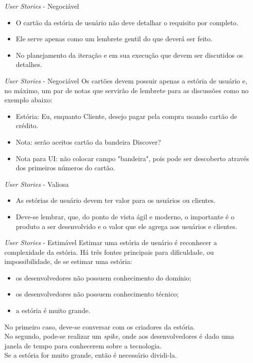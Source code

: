 \documentclass[11pt]{beamer}
\begin{document}
   \begin{frame}{\textit{User Stories} - Negociável}
      \begin{itemize}
         \item O cartão da estória de usuário não deve detalhar o requisito por completo.
         \item Ele serve apenas como um lembrete gentil do que deverá ser feito.
         \item No planejamento da iteração e em sua execução que devem ser discutidos os detalhes.
      \end{itemize}
   \end{frame}

   \begin{frame}{\textit{User Stories} - Negociável}
      Os cartões devem possuir apenas a estória de usuário e, no máximo, um par de notas que servirão de lembrete para as discussões como no exemplo abaixo:
      \begin{itemize}
         \item Estória: Eu, enquanto Cliente, desejo pagar pela compra usando cartão de crédito.
         \item Nota: serão aceitos cartão da bandeira Discover?
         \item Nota para UI: não colocar campo "bandeira", pois pode ser descoberto através dos primeiros números do cartão.
      \end{itemize}
   \end{frame}

   \begin{frame}{\textit{User Stories} - Valiosa}
      \begin{itemize}
         \item As estórias de usuário devem ter valor para os usuários ou clientes.
         \item Deve-se lembrar, que, do ponto de vista ágil e moderno, o importante é o produto a ser desenvolvido e o valor que ele agrega aos usuários e clientes.
      \end{itemize}
   \end{frame}

   \begin{frame}{\textit{User Stories} - Estimável}
      Estimar uma estória de usuário é reconhecer a complexidade da estória. Há três fontes principais para dificuldade, ou impossibilidade, de se estimar uma estória:
      \begin{itemize}
         \item os desenvolvedores não possuem conhecimento do domínio;
         \item os desenvolvedores não possuem conhecimento técnico;
         \item a estória é muito grande.
      \end{itemize}
      No primeiro caso, deve-se conversar com os criadores da estória.\\ 
      No segundo, pode-se realizar um \textit{spike}, onde aos desenvolvedores é dado uma janela de tempo para conhecerem sobre a tecnologia.\\ 
      Se a estória for muito grande, então é necessário dividi-la.
   \end{frame}
\end{document}
